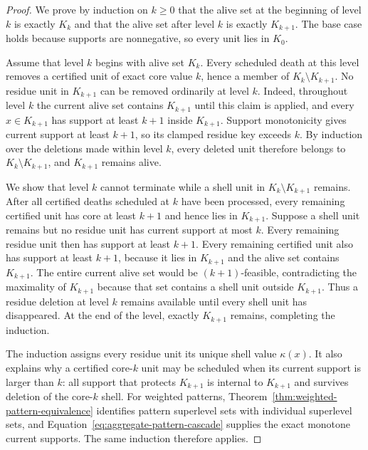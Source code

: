 \begin{proof}
We prove by induction on $k\geq0$ that the alive set at the beginning of level $k$ is exactly $K_k$ and that the alive set after level $k$ is exactly $K_{k+1}$.
%
The base case holds because supports are nonnegative, so every unit lies in $K_0$.

Assume that level $k$ begins with alive set $K_k$.
%
Every scheduled death at this level removes a certified unit of exact core value $k$, hence a member of $K_k\setminus K_{k+1}$.
%
No residue unit in $K_{k+1}$ can be removed ordinarily at level $k$.
%
Indeed, throughout level $k$ the current alive set contains $K_{k+1}$ until this claim is applied, and every $x\in K_{k+1}$ has support at least $k+1$ inside $K_{k+1}$.
%
Support monotonicity gives current support at least $k+1$, so its clamped residue key exceeds $k$.
%
By induction over the deletions made within level $k$, every deleted unit therefore belongs to $K_k\setminus K_{k+1}$, and $K_{k+1}$ remains alive.

We show that level $k$ cannot terminate while a shell unit in $K_k\setminus K_{k+1}$ remains.
%
After all certified deaths scheduled at $k$ have been processed, every remaining certified unit has core at least $k+1$ and hence lies in $K_{k+1}$.
%
Suppose a shell unit remains but no residue unit has current support at most $k$.
%
Every remaining residue unit then has support at least $k+1$.
%
Every remaining certified unit also has support at least $k+1$, because it lies in $K_{k+1}$ and the alive set contains $K_{k+1}$.
%
The entire current alive set would be $(k+1)$-feasible, contradicting the maximality of $K_{k+1}$ because that set contains a shell unit outside $K_{k+1}$.
%
Thus a residue deletion at level $k$ remains available until every shell unit has disappeared.
%
At the end of the level, exactly $K_{k+1}$ remains, completing the induction.

The induction assigns every residue unit its unique shell value $\kappa(x)$.
%
It also explains why a certified core-$k$ unit may be scheduled when its current support is larger than $k$: all support that protects $K_{k+1}$ is internal to $K_{k+1}$ and survives deletion of the core-$k$ shell.
%
For weighted patterns, Theorem~\ref{thm:weighted-pattern-equivalence} identifies pattern superlevel sets with individual superlevel sets, and Equation~\eqref{eq:aggregate-pattern-cascade} supplies the exact monotone current supports.
%
The same induction therefore applies.
\end{proof}

